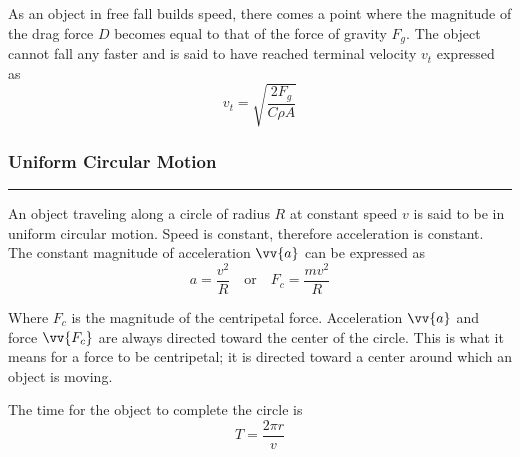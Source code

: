 \documentclass{article}
\begin{document}
    \smallskip\noindent
    As an object in free fall builds speed, there comes a point where the magnitude of the drag force ${D}$ becomes equal to that of the force of gravity $F_g$.
    The object cannot fall any faster and is said to have reached terminal velocity $v_t$ expressed as
    \[
        v_t = \sqrt{\frac{2F_g}{C\rho A}}
    \]

    \smallskip
    \subsubsection*{Uniform Circular Motion}
    \vspace{-1em}
    \rule{\linewidth}{.1mm}

    \smallskip\noindent
    An object traveling along a circle of radius $R$ at constant speed $v$ is said to be in uniform circular motion.
    Speed is constant, therefore acceleration is constant.
    The constant magnitude of acceleration $\vv{a}$ can be expressed as
    \[
        a=\frac{v^2}{R} \quad \text{or} \quad F_c=\frac{mv^2}{R}
    \]

    \smallskip\noindent
    Where $F_c$ is the magnitude of the centripetal force.
    Acceleration $\vv{a}$ and force $\vv{F_c}$ are always directed toward the center of the circle.
    This is what it means for a force to be centripetal; it is directed toward a center around which an object is moving.

    \medskip\noindent
    The time for the object to complete the circle is
    \[
        T = \frac{2\pi r}{v}
    \]
\end{document}
